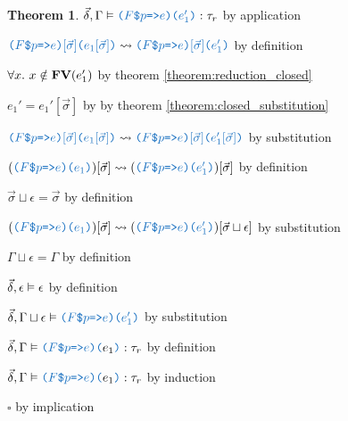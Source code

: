 \documentclass[acmsmall]{acmart}
\theoremstyle{definition}
\newtheorem{theorem}{Theorem}[section]
\begin{document}
\begin{theorem}
      \item \Z\Z $\vec{\delta}, \Gamma \satisfies \obj{($F$\$$p$=>$e$)($e_1'$)} \hastype \tau_r$ by application
      \item \Z\Z $\obj{($F$\$$p$=>$e$)$[\vec{\sigma}]$($e_1[\vec{\sigma}]$)} \rightsquigarrow \obj{($F$\$$p$=>$e$)$[\vec{\sigma}]$($e_1'$)}$ by definition 
      \item \Z\Z $\forall x .\ x \notin \textbf{FV}(e_1')$ by theorem \ref{theorem:reduction_closed} 
      \item \Z\Z $e_1' = e_1'[\vec{\sigma}]$ by by theorem \ref{theorem:closed_substitution} 
      \item \Z\Z $\obj{($F$\$$p$=>$e$)$[\vec{\sigma}]$($e_1[\vec{\sigma}]$)} \rightsquigarrow \obj{($F$\$$p$=>$e$)$[\vec{\sigma}]$($e_1'[\vec{\sigma}]$)}$ by substitution 
      \item \Z\Z $(\obj{($F$\$$p$=>$e$)($e_1$)})[\vec{\sigma}] \rightsquigarrow (\obj{($F$\$$p$=>$e$)($e_1'$)})[\vec{\sigma}]$ by definition 
      \item \Z\Z $\vec{\sigma} \sqcup \epsilon = \vec{\sigma}$ by definition 
      \item \Z\Z $(\obj{($F$\$$p$=>$e$)($e_1$)})[\vec{\sigma}] \rightsquigarrow (\obj{($F$\$$p$=>$e$)($e_1'$)})[\vec{\sigma} \sqcup \epsilon]$ by substitution 
      \item \Z\Z $\Gamma \sqcup \epsilon = \Gamma$ by definition
      \item \Z\Z $\vec{\delta}, \epsilon \vDash \epsilon$ by definition
      \item \Z\Z $\vec{\delta}, \Gamma \sqcup \epsilon \satisfies \obj{($F$\$$p$=>$e$)($e_1'$)}$ by substitution 
      \item \Z\Z $\vec{\delta}, \Gamma \satisfies \obj{($F$\$$p$=>$e$)}\obj{(}e_1\obj{)} \hastype \tau_r$ by definition
    \item \Z $\vec{\delta}, \Gamma \satisfies \obj{($F$\$$p$=>$e$)}\obj{(}e_1\obj{)} \hastype \tau_r$ by induction
  \item $\square$ by implication 
\end{theorem}
\end{document}
